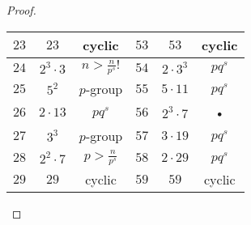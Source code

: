 \documentclass[10pt]{article}
\begin{document}
\begin{enumerate}
\begin{proof}
\begin{center}
\begin{tabular}{|c|c|c||c|c|c|}
\hline 
$23$ & $23$ & cyclic & $53$ & $53$ & cyclic \\ 
\hline 
$24$ & $2^3 \cdot 3$ & $n > \frac{n}{p^s}!$ & $54$ & $2 \cdot 3^3$ & $pq^s$ \\ 
\hline 
$25$ & $5^2$ & $p$-group & $55$ & $5 \cdot 11$ & $pq^s$ \\ 
\hline 
$26$ & $2 \cdot 13$ & $pq^s$ & $56$ & $2^3 \cdot 7$ & • \\ 
\hline 
$27$ & $3^3$ & $p$-group & $57$ & $3 \cdot 19$ & $pq^s$ \\ 
\hline 
$28$ & $2^2 \cdot 7$ & $p > \frac{n}{p^s}$ & $58$ & $2 \cdot 29$ & $pq^s$ \\ 
\hline 
$29$ & $29$ & cyclic & $59$ & $59$ & cyclic \\ 
\hline 
\end{tabular}
\end{center}

\end{proof}
\end{enumerate}
\end{document}
